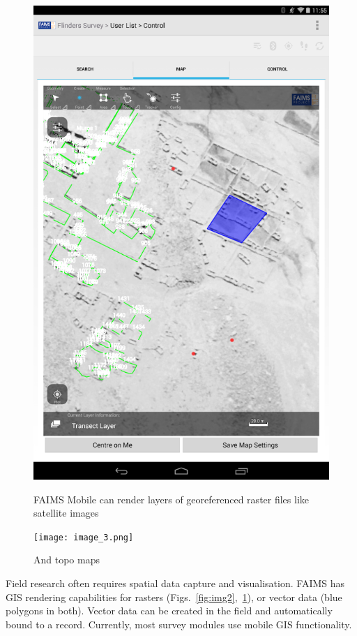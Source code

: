 \documentclass[preprint,12pt, a4paper]{elsarticle}
\begin{document}
\begin{figure}[!htb]
\includegraphics[width=\linewidth]{image_2.png}
	\caption{FAIMS Mobile can render layers of georeferenced raster files like satellite images}
	\label{fig:img2}
\endminipage\hfill
{}
\texttt{[image: image\_3.png]}
	\caption{And topo maps}
	\label{fig:img3}
\endminipage\hfill

\end{figure}


Field research often requires spatial data capture and visualisation. FAIMS has GIS rendering capabilities for rasters (Figs.~\ref{fig:img2},~\ref{fig:img3}), or vector data (blue polygons in both). Vector data can be created in the field and automatically bound to a record. Currently, most survey modules use mobile GIS functionality. 
\end{document}
